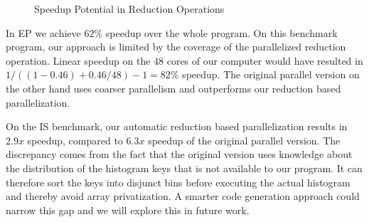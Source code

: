 \ParallelisationData

\begin{figure}[H]
  \centering
  \caption{Speedup Potential in Reduction Operations}
  \label{speedup-figure}
\end{figure}

In EP we achieve $62\%$ speedup over the whole program.
On this benchmark program, our approach is limited by the coverage of the parallelized reduction operation.
Linear speedup on the 48 cores of our computer would have resulted in $1/((1-0.46)+0.46/48)-1=82\%$ speedup.
The original parallel version on the other hand uses coarser parallelism and outperforms our reduction based parallelization.

On the IS benchmark, our automatic reduction based parallelization results in $2.9x$ speedup, compared to $6.3x$ speedup of the original parallel version.
The discrepancy comes from the fact that the original version uses knowledge about the distribution of the histogram keys that is not available to our program.
It can therefore sort the keys into disjunct bins before executing the actual histogram and thereby avoid array privatization.
A smarter code generation approach could narrow this gap and we will explore this in future work.

